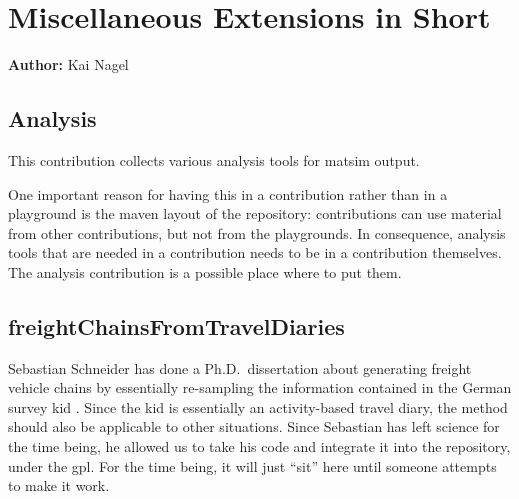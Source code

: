\chapter{Miscellaneous Extensions in Short}
\label{ch:misccontribs}

\hfill \textbf{Author:} Kai Nagel

\section{Analysis}
\label{sec:contrib-analysis}



This \gls{contribution} collects various analysis tools for \gls{matsim} output.  

One important reason for having this in a \gls{contribution} rather than in a playground is the \gls{maven} layout of the repository: \Glspl{contribution} can use material from other \glspl{contribution}, but not from the playgrounds. 
In consequence, analysis tools that are needed in a \gls{contribution} needs to be in a \gls{contribution} themselves. 
The analysis \gls{contribution} is a possible place where to put them.

\section{freightChainsFromTravelDiaries}
\label{sec:freightChainsFromTravelDiaries}


Sebastian Schneider has done a Ph.D.\ dissertation about generating freight vehicle chains by essentially re-sampling the information contained in the German survey \gls{kid} \citep{SteinmeyerWagner2005KiD}.  
Since the \gls{kid} is essentially an activity-based travel diary, the method should also be applicable to other situations.
Since Sebastian has left science for the time being, he allowed us to take his code and integrate it into the repository, under the \gls{gpl}. For the time being, it will just ``sit'' here until someone attempts to make it work.

